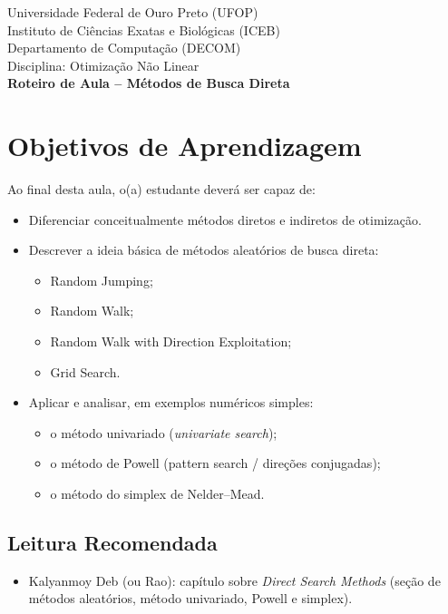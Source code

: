 \documentclass[9pt,a4paper]{extarticle}
\begin{document}
\begin{center}
    \large
    Universidade Federal de Ouro Preto (UFOP)\\
    Instituto de Ciências Exatas e Biológicas (ICEB)\\
    Departamento de Computação (DECOM)\\[0.5em]
    \normalsize
    Disciplina: Otimização Não Linear\\[0.5em]
    \textbf{Roteiro de Aula – Métodos de Busca Direta}
\end{center}

\vspace{1em}

\section*{Objetivos de Aprendizagem}

Ao final desta aula, o(a) estudante deverá ser capaz de:
\begin{itemize}
    \item Diferenciar conceitualmente métodos diretos e indiretos de otimização.
    \item Descrever a ideia básica de métodos aleatórios de busca direta:
    \begin{itemize}
        \item Random Jumping;
        \item Random Walk;
        \item Random Walk with Direction Exploitation;
        \item Grid Search.
    \end{itemize}
    \item Aplicar e analisar, em exemplos numéricos simples:
    \begin{itemize}
        \item o método univariado (\emph{univariate search});
        \item o método de Powell (pattern search / direções conjugadas);
        \item o método do simplex de Nelder--Mead.
    \end{itemize}
\end{itemize}

\subsection*{Leitura Recomendada}

\begin{itemize}
    \item Kalyanmoy Deb (ou Rao): capítulo sobre \emph{Direct Search Methods} (seção de métodos aleatórios, método univariado, Powell e simplex).
\end{itemize}
\end{document}
